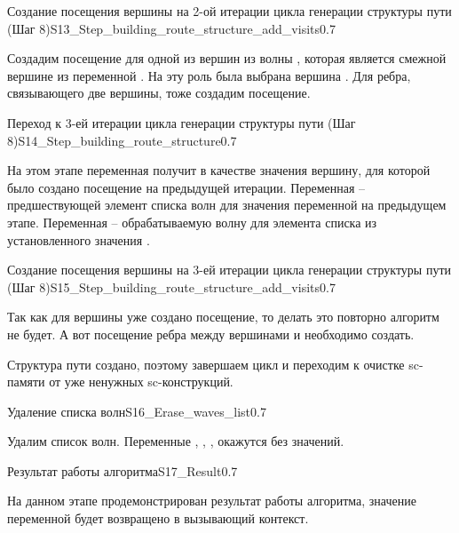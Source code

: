 \begin{algostep}{Создание посещения вершины на 2-ой итерации цикла
    генерации структуры пути (Шаг
    8)}{S13_Step_building_route_structure_add_visits}{0.7}

  Создадим посещение для одной из вершин из волны ,
  которая является смежной вершине из переменной
  . На эту роль была выбрана вершина . Для
  ребра, связывающего две вершины, тоже создадим посещение.
\end{algostep}


\begin{algostep}{Переход к 3-ей итерации цикла генерации структуры пути
    (Шаг 8)}{S14_Step_building_route_structure}{0.7}
 
  На этом этапе переменная  получит в качестве
  значения вершину, для которой было создано посещение на предыдущей
  итерации. Переменная  – предшествующей элемент
  списка волн для значения переменной  на предыдущем
  этапе. Переменная  – обрабатываемую волну для
  элемента списка из установленного значения .
\end{algostep}


\begin{algostep}{Создание посещения вершины на 3-ей итерации цикла
    генерации структуры пути (Шаг
    8)}{S15_Step_building_route_structure_add_visits}{0.7}
 
  Так как для вершины  уже создано посещение, то делать это
  повторно алгоритм не будет. А вот посещение ребра между вершинами
   и  необходимо создать.

  Структура пути создано, поэтому завершаем цикл и переходим к очистке
  sc-памяти от уже ненужных sc-конструкций.
\end{algostep}

\begin{algostep}{Удаление списка волн}{S16_Erase_waves_list}{0.7}
 
  Удалим список волн. Переменные ,
  , ,
   окажутся без значений.
\end{algostep}


\begin{algostep}{Результат работы алгоритма}{S17_Result}{0.7}
 
  На данном этапе продемонстрирован результат работы алгоритма,
  значение переменной  будет возвращено в вызывающий
  контекст.
\end{algostep}

